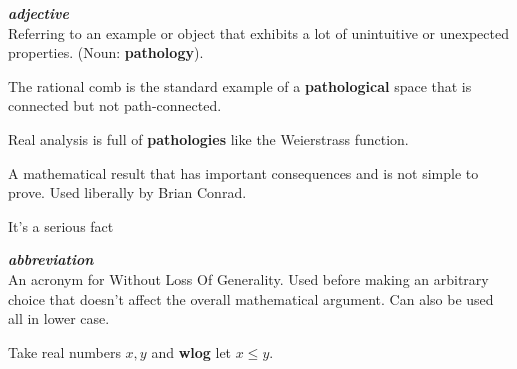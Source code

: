 \documentclass[12pt,x11names]{article}
\begin{document}
\begin{definition}[QED]
    
\end{definition}

\begin{definition}[Pathological]
\textbf{\textit{adjective}}\\
Referring to an example or object that exhibits a lot of unintuitive or unexpected properties. (Noun: \textbf{pathology}).
\end{definition}
\begin{example}
    The rational comb is the standard example of a \textbf{pathological} space that is connected but not path-connected.
\end{example}

\begin{example}
    Real analysis is full of \textbf{pathologies} like the Weierstrass function.
\end{example}

\begin{definition}
A mathematical result that has important consequences and is not simple to prove. Used liberally by Brian Conrad.
\end{definition}

\begin{example}
It's a serious fact 
\end{example}


\begin{definition}[TFAE]
    
\end{definition}

\begin{definition}

\end{definition}

\begin{definition}[Up to]
    
\end{definition}

\begin{definition}[Vacuously]
    
\end{definition}

\begin{definition}[Visibly]
    
\end{definition}

\begin{definition}[WLOG]
    \textbf{\textit{abbreviation}}\\
    An acronym for Without Loss Of Generality. Used before making an arbitrary choice that doesn't affect the overall mathematical argument. Can also be used all in lower case.
\end{definition}
\begin{example}
    Take real numbers $x, y$ and \textbf{wlog} let $x \leq y$.
\end{example}
\end{document}
